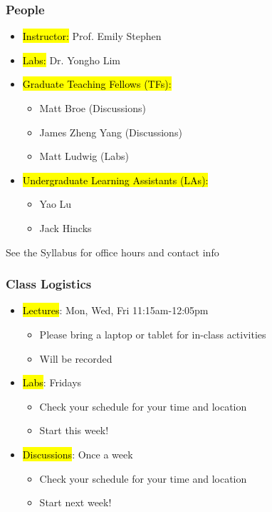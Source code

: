 \documentclass[slidestop,compress,mathserif]{beamer}
\begin{document}
\begin{frame}
	\frametitle{People}
	\begin{itemize}
		\item \hl{Instructor:} Prof. Emily Stephen
		\item \hl{Labs:} Dr. Yongho Lim
		\item \hl{Graduate Teaching Fellows (TFs):} 
		\begin{itemize}
			\item Matt Broe (Discussions)
			\item James Zheng Yang (Discussions)
			\item Matt Ludwig (Labs)
		\end{itemize}
		\item \hl{Undergraduate Learning Assistants (LAs):}
		\begin{itemize}
			\item Yao Lu
			\item Jack Hincks
		\end{itemize}
	\end{itemize}

	See the Syllabus for office hours and contact info
\end{frame}

\begin{frame}
	\frametitle{Class Logistics}
	\begin{itemize}
		\item \hl{Lectures}: Mon, Wed, Fri 11:15am-12:05pm
		\begin{itemize}
			\item Please bring a laptop or tablet for in-class activities
			\item Will be recorded
		\end{itemize}
		\item \hl{Labs}: Fridays
		\begin{itemize}
			\item Check your schedule for your time and location
			\item Start this week!
		\end{itemize}
		\item \hl{Discussions}: Once a week
		\begin{itemize}
			\item Check your schedule for your time and location
			\item Start next week!
		\end{itemize}
	\end{itemize}
\end{frame}
\end{document}
